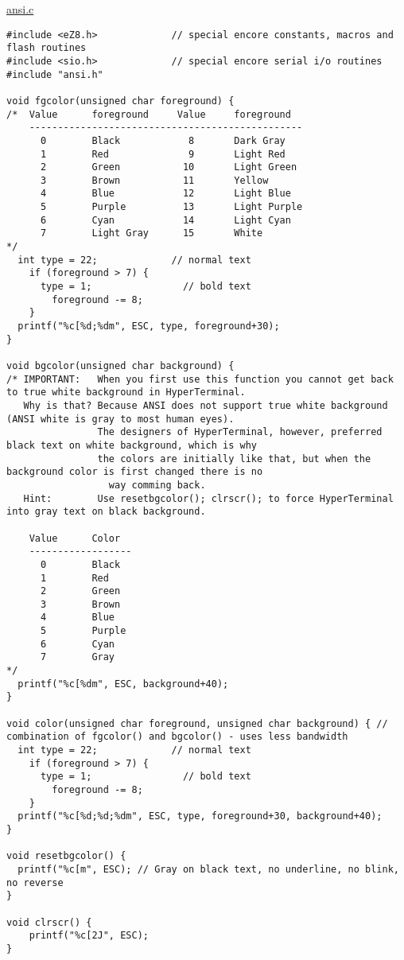 \underline{ansi.c}
\begin{lstlisting}
#include <eZ8.h>             // special encore constants, macros and flash routines
#include <sio.h>             // special encore serial i/o routines
#include "ansi.h"

void fgcolor(unsigned char foreground) {
/*  Value      foreground     Value     foreground
    ------------------------------------------------
      0        Black            8       Dark Gray
      1        Red              9       Light Red
      2        Green           10       Light Green
      3        Brown           11       Yellow
      4        Blue            12       Light Blue
      5        Purple          13       Light Purple
      6        Cyan            14       Light Cyan
      7        Light Gray      15       White
*/
  int type = 22;             // normal text
	if (foreground > 7) {
	  type = 1;                // bold text
		foreground -= 8;
	}
  printf("%c[%d;%dm", ESC, type, foreground+30);
}

void bgcolor(unsigned char background) {
/* IMPORTANT:   When you first use this function you cannot get back to true white background in HyperTerminal.
   Why is that? Because ANSI does not support true white background (ANSI white is gray to most human eyes).
                The designers of HyperTerminal, however, preferred black text on white background, which is why
                the colors are initially like that, but when the background color is first changed there is no
 	              way comming back.
   Hint:        Use resetbgcolor(); clrscr(); to force HyperTerminal into gray text on black background.

    Value      Color      
    ------------------
      0        Black
      1        Red
      2        Green
      3        Brown
      4        Blue
      5        Purple
      6        Cyan
      7        Gray
*/
  printf("%c[%dm", ESC, background+40);
}

void color(unsigned char foreground, unsigned char background) { // combination of fgcolor() and bgcolor() - uses less bandwidth
  int type = 22;             // normal text
	if (foreground > 7) {
	  type = 1;                // bold text
		foreground -= 8;
	}
  printf("%c[%d;%d;%dm", ESC, type, foreground+30, background+40);
}

void resetbgcolor() {
  printf("%c[m", ESC); // Gray on black text, no underline, no blink, no reverse
}

void clrscr() {
	printf("%c[2J", ESC);	
}


\end{lstlisting}
